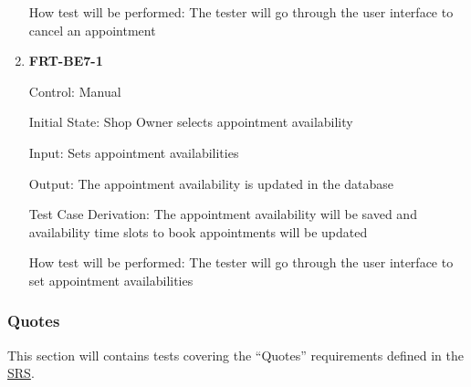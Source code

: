 \documentclass[12pt, titlepage]{article}
\begin{document}
\begin{enumerate}
	      How test will be performed: The tester will go through the user interface to cancel an appointment

	\item \textbf{FRT-BE7-1}

	      Control: Manual

	      Initial State: Shop Owner selects appointment availability

	      Input: Sets appointment availabilities

	      Output: The appointment availability is updated in the database

	      Test Case Derivation: The appointment availability will be saved and availability time slots to
	      book appointments will be updated

	      How test will be performed: The tester will go through the user interface to set appointment
	      availabilities
\end{enumerate}

\subsubsection{Quotes}

This section will contains tests covering the ``Quotes'' requirements defined in the
\href{https://github.com/arkinmodi/project-sayyara/blob/main/docs/SRS/SRS.pdf}{SRS}.
\end{document}
